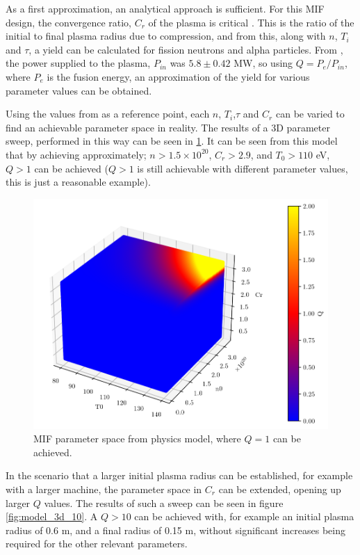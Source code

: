 As a first approximation, an analytical approach is sufficient. For this MIF design, the convergence ratio, $C_r$ of the plasma is critical \cite{ellis2001experiment}. This is the ratio of the initial to final plasma radius due to compression, and from this, along with $n$, $T_i$ and $\tau$, a yield can be calculated for fission neutrons and alpha particles. From \cite{reid2014100}, the power supplied to the plasma, $P_{in}$ was $5.8 \pm 0.42$ MW, so using $Q = P_e/P_{in}$, where $P_e$ is the fusion energy, an approximation of the yield for various parameter values can be obtained. 


 Using the values from \cite{reid2014100} as a reference point, each $n$, $T_i$,$\tau$ and $C_r$ can be varied to find an achievable parameter space in reality. The results of a 3D parameter sweep, performed in this way can be seen in \ref{fig:model_3d_1}. It can be seen from this model that by achieving approximately; $n > 1.5 \times 10^{20}$, $C_r > 2.9$, and $T_0 > 110$ eV, $Q > 1$ can be achieved ($Q > 1$ is still achievable with different parameter values, this is just a reasonable example). 

\begin{figure}[h!] 
\centering
\includegraphics[scale=0.51]{SubreportFigures/Q_n0_T0_Cr_1_3d.pdf}
\caption{MIF parameter space from physics model, where $Q = 1$ can be achieved.}
\label{fig:model_3d_1}
\end{figure}

In the scenario that a larger initial plasma radius can be established, for example with a larger machine, the parameter space in $C_r$ can be extended, opening up larger $Q$ values. The results of such a sweep can be seen in figure \ref{fig:model_3d_10}. A $Q > 10$ can be achieved with, for example an initial plasma radius of 0.6 m, and a final radius of 0.15 m, without significant increases being required for the other relevant parameters.

